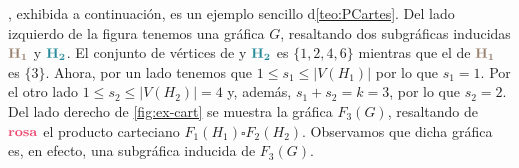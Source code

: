 , exhibida a continuaci\'on, es un ejemplo sencillo
d\cref{teo:PCartes}. Del lado izquierdo de la figura tenemos una gr\'afica $G$,
resaltando dos subgr\'aficas inducidas ${\color{baige}\bf H_1}$ y
${\color{azulMetal}\bf H_2}$. El conjunto de v\'ertices de  y
${\color{azulMetal}\bf H_2}$  es $\{1,2,4,6\}$ mientras que el de
${\color{baige}\bf H_1}$ es $\{3\}$. Ahora, por un lado tenemos que $1\leq s_1
\leq |V(H_1)|$ por lo que $s_1 =1$. Por el otro lado $1\leq s_2 \leq |V(H_2)| =
4$ y, adem\'as, $s_1+s_2 = k =3$, por lo que $s_2 =2$. Del lado derecho de
\cref{fig:ex-cart} se muestra la gr\'afica $F_3(G)$, resaltando de
$\color{fushia} \bf rosa$ el producto carteciano $F_1(H_1) \square F_2(H_2)$.
Observamos que dicha gr\'afica es, en efecto, una subgr\'afica inducida de
$F_3(G)$.

\begin{figure}[ht!]
    \centering
\end{figure}

